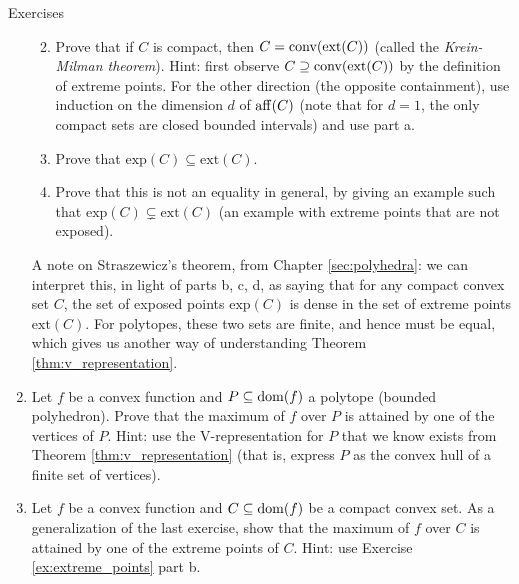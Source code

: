 \begin{xcb}{Exercises}
\begin{enumerate}[label=\thechapter.\arabic*]
\begin{enumerate}[label=\alph*.]
\item Prove that if $C$ is compact, then $C = \operatorname{conv}(\mathrm{ext}(C))$ (called
  the \emph{Krein-Milman theorem}). Hint: first observe $C \supseteq
  \operatorname{conv}(\mathrm{ext}(C))$ by the definition of extreme points. For the other
  direction (the opposite containment), use induction on the dimension $d$ of
  $\operatorname{aff}(C)$ (note that for $d=1$, the only compact sets are closed bounded
  intervals) and use part a.   

\item Prove that $\mathrm{exp}(C) \subseteq \mathrm{ext}(C)$. 

\item Prove that this is not an equality in general, by giving an example such 
  that $\mathrm{exp}(C) \subsetneq \mathrm{ext}(C)$ (an example with extreme
  points that are not exposed).     
\end{enumerate}

\smallskip
A note on Straszewicz's theorem, from Chapter \ref{sec:polyhedra}: we can
interpret this, in light of parts b, c, d, as saying that for any compact convex
set $C$, the set of exposed points $\mathrm{exp}(C)$ is dense in the set of
extreme points $\mathrm{ext}(C)$. For polytopes, these two sets are finite, and
hence must be equal, which gives us another way of understanding Theorem 
\ref{thm:v_representation}.  

\item Let $f$ be a convex function and $P \subseteq \operatorname{dom}(f)$ a polytope
  (bounded polyhedron). Prove that the maximum of $f$ over $P$ is attained by
  one of the vertices of $P$. Hint: use the V-representation for $P$ that we
  know exists from Theorem \ref{thm:v_representation} (that is, express $P$ as
  the convex hull of a finite set of vertices). 

\item \label{ex:convex_maximization}
  Let $f$ be a convex function and $C \subseteq \operatorname{dom}(f)$ be a compact convex
  set. As a generalization of the last exercise, show that the maximum of $f$
  over $C$ is attained by one of the extreme points of $C$. Hint: use Exercise
  \ref{ex:extreme_points} part b. 
\end{enumerate}
\end{xcb}